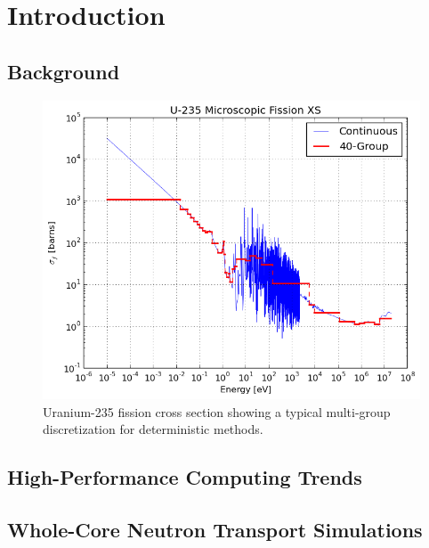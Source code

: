 \chapter{Introduction}
\label{chap:intro}

\section{Background}
\label{sec:chap1-background}

\begin{figure}
  \centering
  \includegraphics[width=5in]{figures/u235-fission-40-group.png}
  \caption[Uranium-238 capture cross section]{Uranium-235 fission cross section
  showing a typical multi-group discretization for deterministic
  methods.\label{fig:multigroup}}
\end{figure}


\section{High-Performance Computing Trends}
\label{sec:chap1-hpc-trends}


\section{Whole-Core Neutron Transport Simulations}
\label{sec:chap1-whole-core-transport}



